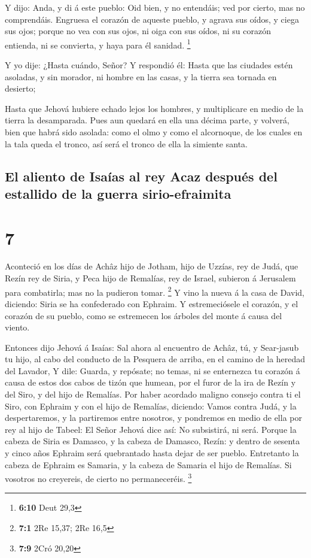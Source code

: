  Y dijo: Anda, y di á este pueblo: Oid bien, y no entendáis;
ved por cierto, mas no comprendáis.  Engruesa el corazón de
aqueste pueblo, y agrava sus oídos, y ciega sus ojos; porque no vea con
sus ojos, ni oiga con sus oídos, ni su corazón entienda, ni se
convierta, y haya para él sanidad. \footnote{\textbf{6:10} Deut 29,3}

 Y yo dije: ¿Hasta cuándo, Señor? Y respondió él: Hasta que
las ciudades estén asoladas, y sin morador, ni hombre en las casas, y la
tierra sea tornada en desierto;

 Hasta que Jehová hubiere echado lejos los hombres, y
multiplicare en medio de la tierra la desamparada.  Pues
aun quedará en ella una décima parte, y volverá, bien que habrá sido
asolada: como el olmo y como el alcornoque, de los cuales en la tala
queda el tronco, así será el tronco de ella la simiente santa.

\hypertarget{el-aliento-de-isauxedas-al-rey-acaz-despuuxe9s-del-estallido-de-la-guerra-sirio-efraimita}{%
\subsection{El aliento de Isaías al rey Acaz después del estallido de la
guerra
sirio-efraimita}\label{el-aliento-de-isauxedas-al-rey-acaz-despuuxe9s-del-estallido-de-la-guerra-sirio-efraimita}}

\hypertarget{section-6}{%
\section{7}\label{section-6}}

 Aconteció en los días de Achâz hijo de Jotham, hijo de
Uzzías, rey de Judá, que Rezín rey de Siria, y Peca hijo de Remalías,
rey de Israel, subieron á Jerusalem para combatirla; mas no la pudieron
tomar. \footnote{\textbf{7:1} 2Re 15,37; 2Re 16,5}  Y vino
la nueva á la casa de David, diciendo: Siria se ha confederado con
Ephraim. Y estremeciósele el corazón, y el corazón de su pueblo, como se
estremecen los árboles del monte á causa del viento.

 Entonces dijo Jehová á Isaías: Sal ahora al encuentro de
Achâz, tú, y Sear-jasub tu hijo, al cabo del conducto de la Pesquera de
arriba, en el camino de la heredad del Lavador,  Y dile:
Guarda, y repósate; no temas, ni se enternezca tu corazón á causa de
estos dos cabos de tizón que humean, por el furor de la ira de Rezín y
del Siro, y del hijo de Remalías.  Por haber acordado
maligno consejo contra ti el Siro, con Ephraim y con el hijo de
Remalías, diciendo:  Vamos contra Judá, y la despertaremos,
y la partiremos entre nosotros, y pondremos en medio de ella por rey al
hijo de Tabeel:  El Señor Jehová dice así: No subsistirá, ni
será.  Porque la cabeza de Siria es Damasco, y la cabeza de
Damasco, Rezín: y dentro de sesenta y cinco años Ephraim será
quebrantado hasta dejar de ser pueblo.  Entretanto la cabeza
de Ephraim es Samaria, y la cabeza de Samaria el hijo de Remalías. Si
vosotros no creyereis, de cierto no permaneceréis. \footnote{\textbf{7:9}
  2Cró 20,20}

